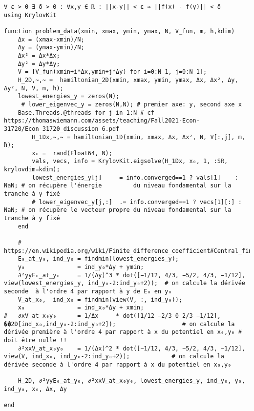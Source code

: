 \begin{verbatim}
∀ ε > 0 ∃ δ > 0 : ∀x,y ∈ ℝ : ||x-y|| < ε ⇒ ||f(x) - f(y)|| < δ
using KrylovKit

function problem_data(xmin, xmax, ymin, ymax, N, V_fun, m, ħ,kdim)
    Δx = (xmax-xmin)/N;
    Δy = (ymax-ymin)/N;
    Δx² = Δx*Δx;
    Δy² = Δy*Δy;
    V = [V_fun(xmin+i*Δx,ymin+j*Δy) for i=0:N-1, j=0:N-1];
    H_2D,~,~ =  hamiltonian_2D(xmin, xmax, ymin, ymax, Δx, Δx², Δy, Δy², N, V, m, ħ);
    lowest_energies_y = zeros(N);
     # lower_eigenvec_y = zeros(N,N); # premier axe: y, second axe x
    Base.Threads.@threads for j in 1:N # cf https://thomaswiemann.com/assets/teaching/Fall2021-Econ-31720/Econ_31720_discussion_6.pdf
        H_1Dx,~,~ = hamiltonian_1D(xmin, xmax, Δx, Δx², N, V[:,j], m, ħ);
        x₀ =  rand(Float64, N);
        vals, vecs, info = KrylovKit.eigsolve(H_1Dx, x₀, 1, :SR, krylovdim=kdim);
        lowest_energies_y[j]     = info.converged==1 ? vals[1]    : NaN; # on récupère l'énergie         du niveau fondamental sur la tranche à y fixé
        # lower_eigenvec_y[j,:]  .= info.converged==1 ? vecs[1][:] : NaN; # on récupère le vecteur propre du niveau fondamental sur la tranche à y fixé
    end  

    # https://en.wikipedia.org/wiki/Finite_difference_coefficient#Central_finite_difference
    E₀_at_y₀, ind_y₀ = findmin(lowest_energies_y);
    y₀               = ind_y₀*Δy + ymin;
    ∂²yyE₀_at_y₀     = 1/(Δy)^3 * dot([−1/12, 4/3, −5/2, 4/3, −1/12], view(lowest_energies_y, ind_y₀-2:ind_y₀+2));  # on calcule la dérivée seconde  à l'ordre 4 par rapport à y de E₀ en y₀
    V_at_x₀,  ind_x₀ = findmin(view(V, :, ind_y₀));
    x₀               = ind_x₀*Δy + xmin;
#   ∂xV_at_x₀y₀      = 1/Δx     * dot([1/12 −2/3 0 2/3 −1/12], ��2D[ind_x₀,ind_y₀-2:ind_y₀+2]);                   # on calcule la dérivée première à l'ordre 4 par rapport à x du potentiel en x₀,y₀ # doit être nulle !!
    ∂²xxV_at_x₀y₀    = 1/(Δx)^2 * dot([−1/12, 4/3, −5/2, 4/3, −1/12], view(V, ind_x₀, ind_y₀-2:ind_y₀+2));            # on calcule la dérivée seconde à l'ordre 4 par rapport à x du potentiel en x₀,y₀

    H_2D, ∂²yyE₀_at_y₀, ∂²xxV_at_x₀y₀, lowest_energies_y, ind_y₀, y₀, ind_y₀, x₀, Δx, Δy 
    
end
\end{verbatim}